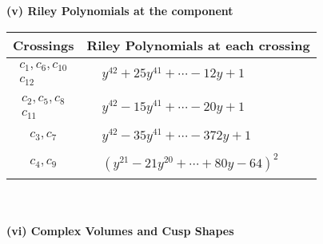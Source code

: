 \documentclass[1p]{elsarticle_modified}
\theoremstyle{definition}
\begin{document}
\newpage\renewcommand{\arraystretch}{1}
\flushleft \textbf{(v) Riley Polynomials at the component}\newline \\
\begin{tabular}{m{50pt}|m{274pt}}
Crossings & \hspace{64pt}Riley Polynomials at each crossing \\
\hline $$\begin{aligned}c_{1},c_{6},c_{10}\\c_{12}\end{aligned}$$&$\begin{aligned}
&y^{42}+25 y^{41}+\cdots-12 y+1
\end{aligned}$\\
\hline $$\begin{aligned}c_{2},c_{5},c_{8}\\c_{11}\end{aligned}$$&$\begin{aligned}
&y^{42}-15 y^{41}+\cdots-20 y+1
\end{aligned}$\\
\hline $$\begin{aligned}c_{3},c_{7}\end{aligned}$$&$\begin{aligned}
&y^{42}-35 y^{41}+\cdots-372 y+1
\end{aligned}$\\
\hline $$\begin{aligned}c_{4},c_{9}\end{aligned}$$&$\begin{aligned}
&(y^{21}-21 y^{20}+\cdots+80 y-64)^{2}
\end{aligned}$\\
\hline
\end{tabular}\\~\\
\newpage\flushleft \textbf{(vi) Complex Volumes and Cusp Shapes}
\end{document}
